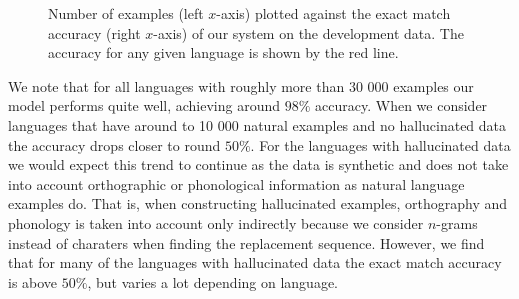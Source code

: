 \documentclass[11pt,a4paper]{article}
\begin{document}
\begin{figure}
\caption{\label{fig:data_acc} Number of examples (left $x$-axis)
plotted against the exact match accuracy (right $x$-axis) of our
system on the development data. The accuracy for any given language is
shown by the red line.}
\end{figure}

We note that for all languages with roughly more than 30 000 examples
our model performs quite well, achieving around $98\%$ accuracy. When
we consider languages that have around to 10 000 natural examples and
no hallucinated data the accuracy drops closer to round $50\%$. For
the languages with hallucinated data we would expect this trend to
continue as the data is synthetic and does not take into account
orthographic or phonological information as natural language examples
do.  That is, when constructing hallucinated examples, orthography and
phonology is taken into account only indirectly because we consider
$n$-grams instead of charaters when finding the replacement
sequence. However, we find that for many of the languages with
hallucinated data the exact match accuracy is above $50\%$, but varies
a lot depending on language.
\end{document}
